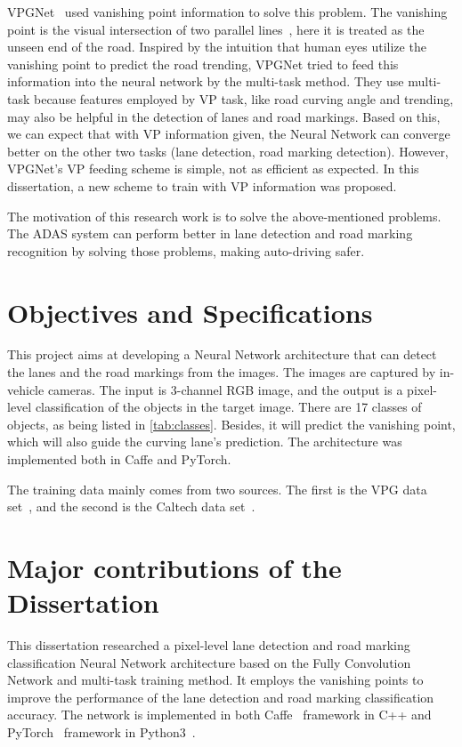 \begin{spacing}{1.5}
VPGNet~\cite{lee2017vpgnet} used vanishing point information to solve this problem. The vanishing point is the visual intersection of two parallel lines~\cite{barnard1983interpreting}, here it is treated as the unseen end of the road.  Inspired by the intuition that human eyes utilize the vanishing point to predict the road trending, VPGNet tried to feed this information into the neural network by the multi-task method. They use multi-task because features employed by VP task, like road curving angle and trending, may also be helpful in the detection of lanes and road markings. Based on this, we can expect that with VP information given, the Neural Network can converge better on the other two tasks (lane detection, road marking detection). However, VPGNet’s VP feeding scheme is simple, not as efficient as expected. In this dissertation, a new scheme to train with VP information was proposed.

The motivation of this research work is to solve the above-mentioned problems. The ADAS system can perform better in lane detection and road marking recognition by solving those problems, making auto-driving safer.

\section{Objectives and Specifications}
\label{sec:IN_objectives}

This project aims at developing a Neural Network architecture that can detect the lanes and the road markings from the images. The images are captured by in-vehicle cameras. The input is 3-channel RGB image, and the output is a pixel-level classification of the objects in the target image. There are 17 classes of objects, as being listed in \autoref{tab:classes}. Besides, it will predict the vanishing point, which will also guide the curving lane's prediction. The architecture was implemented both in Caffe and PyTorch.

The training data mainly comes from two sources. The first is the VPG data set~\cite{lee2017vpgnet}, and the second is the Caltech data set~\cite{aly2008real}.

\section{Major contributions of the Dissertation}
\label{sec:IN_contribution}

This dissertation researched a pixel-level lane detection and road marking classification Neural Network architecture based on the Fully Convolution Network and multi-task training method. It employs the vanishing points to improve the performance of the lane detection and road marking classification accuracy. The network is implemented in both Caffe~\cite{jia2014Caffe} framework in C++ and PyTorch~\cite{NEURIPS2019_9015} framework in Python3~\cite{python3}.


\end{spacing}
